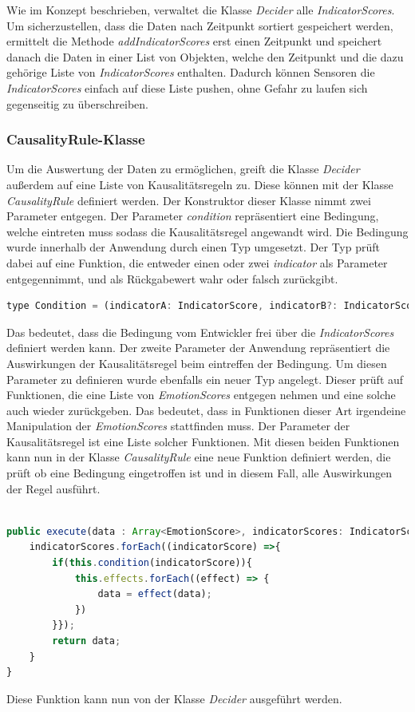 Wie im Konzept beschrieben, verwaltet die Klasse \textit{Decider} alle \textit{IndicatorScores}. Um sicherzustellen, dass die Daten nach Zeitpunkt sortiert gespeichert werden, ermittelt die Methode \textit{addIndicatorScores} erst einen Zeitpunkt und speichert danach die Daten in einer List von Objekten, welche den Zeitpunkt und die dazu gehörige Liste von \textit{IndicatorScores} enthalten. Dadurch können Sensoren die \textit{IndicatorScores} einfach auf diese Liste pushen, ohne Gefahr zu laufen sich gegenseitig zu überschreiben.
\subsubsection{CausalityRule-Klasse}
Um die Auswertung der Daten zu ermöglichen, greift die Klasse \textit{Decider} außerdem auf eine Liste von Kausalitätsregeln zu. Diese können mit der Klasse \textit{CausalityRule} definiert werden.
Der Konstruktor dieser Klasse nimmt zwei Parameter entgegen. Der Parameter \textit{condition} repräsentiert eine Bedingung, welche eintreten muss sodass die Kausalitätsregel angewandt wird. Die Bedingung wurde innerhalb der Anwendung durch einen Typ umgesetzt. Der Typ prüft dabei auf eine Funktion, die entweder einen oder zwei \textit{indicator} als Parameter entgegennimmt, und als Rückgabewert wahr oder falsch zurückgibt.  \newline
\begin{lstlisting}[caption={Typ condition}, language=JavaScript]
	type Condition = (indicatorA: IndicatorScore, indicatorB?: IndicatorScore) => boolean;
\end{lstlisting}
Das bedeutet, dass die Bedingung vom Entwickler frei über die \textit{IndicatorScores} definiert werden kann. Der zweite Parameter der Anwendung repräsentiert die Auswirkungen der Kausalitätsregel beim eintreffen der Bedingung. Um diesen Parameter zu definieren wurde ebenfalls ein neuer Typ angelegt. Dieser prüft auf Funktionen, die eine Liste von \textit{EmotionScores} entgegen nehmen und eine solche auch wieder zurückgeben. Das bedeutet, dass in Funktionen dieser Art irgendeine Manipulation der \textit{EmotionScores} stattfinden muss. Der Parameter der Kausalitätsregel ist eine Liste solcher Funktionen. Mit diesen beiden Funktionen kann nun in der Klasse \textit{CausalityRule} eine neue Funktion definiert werden, die prüft ob eine Bedingung eingetroffen ist und in diesem Fall, alle Auswirkungen der Regel ausführt. \newline
\begin{lstlisting}[caption={execute Funktion der Klasse CausalityRule},language=JavaScript]

public execute(data : Array<EmotionScore>, indicatorScores: IndicatorScore[]) {
	indicatorScores.forEach((indicatorScore) =>{
		if(this.condition(indicatorScore)){
			this.effects.forEach((effect) => {
				data = effect(data);
			})
		}});
		return data;
	}
}

\end{lstlisting}
Diese Funktion kann nun von der Klasse \textit{Decider} ausgeführt werden.

